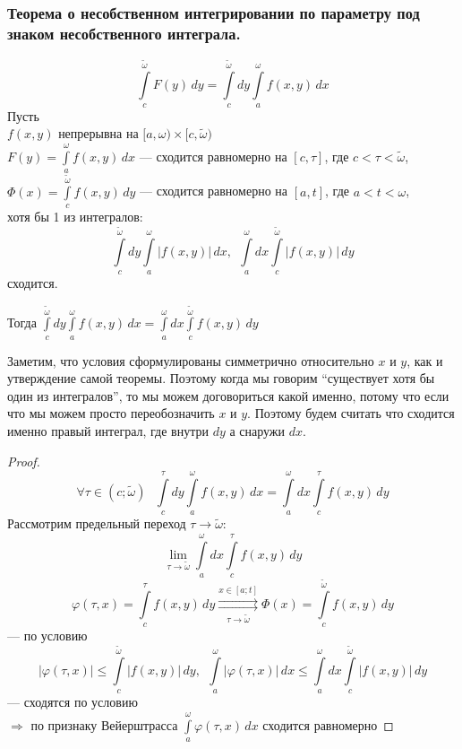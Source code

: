 \subsubsection{Теорема о несобственном интегрировании по параметру под знаком несобственного интеграла.}
\[ \int\limits_c^{\tilde \omega} F(y)\,dy = \int\limits_c^{\tilde \omega} dy \int\limits_a^{\omega} f(x, y)\,dx \]
Пусть \\
\phantom{Пусть} $f(x, y)$ непрерывна на $[a, \omega) \times [c, \tilde \omega)$ \\
\phantom{Пусть} $F(y) = \int\limits_a^{\omega} f(x, y)\,dx$ --- сходится равномерно на $[c, \tau]$, 
где $c < \tau < \tilde \omega$, \\
\phantom{Пусть} $\Phi(x) = \int\limits_c^{\tilde \omega} f(x, y)\,dy$ --- сходится равномерно на $[a, t]$, 
где $a < t < \omega$, \\
\phantom{Пусть} хотя бы 1 из интегралов:
\[ \int\limits_c^{\tilde \omega} dy \int\limits_a^{\omega} |f(x, y)|\,dx, \ \ 
\int\limits_a^{\omega} dx \int\limits_c^{\tilde \omega} |f(x, y)|\,dy \]
\phantom{Пусть} сходится.

Тогда $\int\limits_c^{\tilde \omega} dy \int\limits_a^{\omega} f(x, y)\,dx = 
\int\limits_a^{\omega} dx \int\limits_c^{\tilde \omega} f(x, y)\,dy$

Заметим, что условия сформулированы симметрично относительно $x$ и $y$, как и 
утверждение самой теоремы. Поэтому когда мы говорим ``существует хотя бы один из интегралов'',
то мы можем договориться какой именно, потому что если что мы можем просто переобозначить
$x$ и $y$. Поэтому будем считать что сходится именно правый интеграл, где внутри 
$dy$ а снаружи $dx$.

\begin{proof}
    \[ \forall \tau \in (c; \tilde \omega) \ \ \ \int\limits_c^{\tau} dy \int\limits_a^{\omega} f(x, y)\,dx = 
    \int\limits_a^{\omega} dx \int\limits_c^{\tau} f(x, y)\,dy \]
    Рассмотрим предельный переход $\tau \to \tilde \omega$:
    \[ \lim_{\tau \to \tilde \omega} \int\limits_a^{\omega} dx \int\limits_c^{\tau} f(x, y)\,dy \]
    \[ \varphi(\tau, x) = \int\limits_c^{\tau} f(x, y)\,dy \overset{x \in [a; t]}{\underset{\tau \to \tilde \omega}
    {\rightrightarrows}} \Phi(x) = \int\limits_c^{\tilde \omega} f(x, y)\,dy \]
    --- по условию
    \[ |\varphi(\tau, x)| \le \int\limits_c^{\tilde \omega} |f(x, y)|\,dy, \ \ \int\limits_a^{\omega} |\varphi(\tau, x)|\,dx
    \le \int\limits_a^{\omega} dx \int\limits_c^{\tilde \omega} |f(x, y)|\,dy \]
    --- сходятся по условию \\
    $\Rightarrow$ по признаку Вейерштрасса $\int\limits_a^{\omega} \varphi(\tau, x)\,dx$ сходится равномерно
\end{proof}

